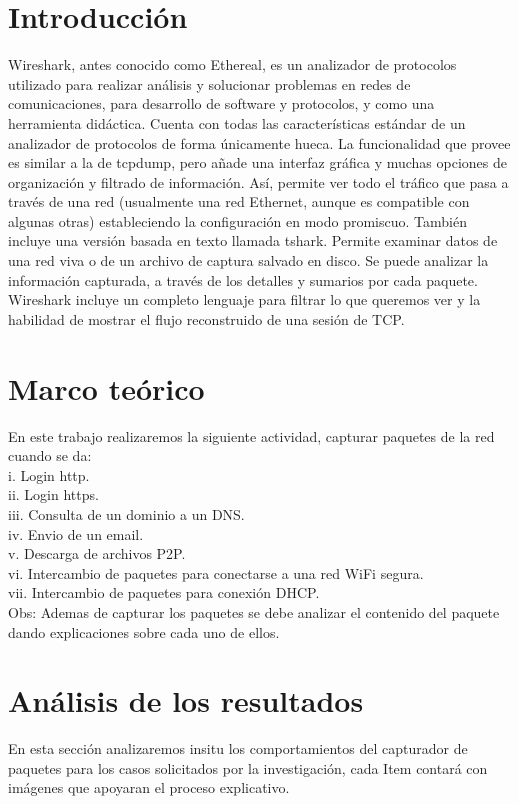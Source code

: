 \documentclass[letterpaper]{article}
\begin{document}
	\section{Introducción}
Wireshark, antes conocido como Ethereal, es un analizador de protocolos utilizado para realizar análisis y solucionar problemas en redes de comunicaciones, para desarrollo de software y protocolos, y como una herramienta didáctica. Cuenta con todas las características estándar de un analizador de protocolos de forma únicamente hueca.
La funcionalidad que provee es similar a la de tcpdump, pero añade una interfaz gráfica y muchas opciones de organización y filtrado de información. Así, permite ver todo el tráfico que pasa a través de una red (usualmente una red Ethernet, aunque es compatible con algunas otras) estableciendo la configuración en modo promiscuo. También incluye una versión basada en texto llamada tshark.
Permite examinar datos de una red viva o de un archivo de captura salvado en disco. Se puede analizar la información capturada, a través de los detalles y sumarios por cada paquete. Wireshark incluye un completo lenguaje para filtrar lo que queremos ver y la habilidad de mostrar el flujo reconstruido de una sesión de TCP.

		
	
\section{Marco teórico}
En este trabajo realizaremos la siguiente actividad, capturar paquetes de la red cuando se da:\\
i. Login http. \\
ii. Login https. \\
iii. Consulta de un dominio a un DNS.\\ 
iv. Envio de un email. \\
v. Descarga de archivos P2P.\\ 
vi. Intercambio de paquetes para conectarse a una red WiFi segura. \\
vii. Intercambio de paquetes para conexión DHCP. \\

Obs: Ademas de capturar los paquetes se debe analizar el contenido del paquete dando explicaciones sobre cada uno de ellos.

\section{Análisis de los resultados}
En esta sección analizaremos insitu los comportamientos del capturador de paquetes para los casos solicitados por la investigación, cada Item contará con imágenes que apoyaran el proceso explicativo.
\end{document}
